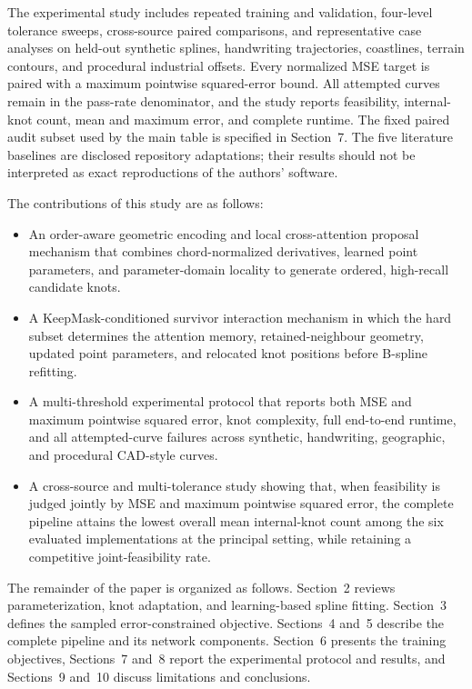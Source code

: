 \documentclass[preprint,12pt]{elsarticle}
\begin{document}
The experimental study includes repeated training and validation, four-level
tolerance sweeps, cross-source paired comparisons, and representative case
analyses on held-out synthetic splines, handwriting trajectories, coastlines,
terrain contours, and procedural industrial offsets. Every normalized MSE
target is paired with a maximum pointwise squared-error bound. All attempted
curves remain in the pass-rate denominator, and the study reports feasibility,
internal-knot count, mean and maximum error, and complete runtime. The fixed
paired audit subset used by the main table is specified in Section~7. The five
literature baselines are disclosed repository adaptations; their results should
not be interpreted as exact reproductions of the authors' software.

The contributions of this study are as follows:
\begin{itemize}
\item An order-aware geometric encoding and local cross-attention proposal
mechanism that combines chord-normalized derivatives, learned point
parameters, and parameter-domain locality to generate ordered, high-recall
candidate knots.
\item A KeepMask-conditioned survivor interaction mechanism in which the hard
subset determines the attention memory, retained-neighbour geometry, updated
point parameters, and relocated knot positions before B-spline refitting.
\item A multi-threshold experimental protocol that reports both MSE and
maximum pointwise squared error, knot complexity, full end-to-end runtime, and
all attempted-curve failures across synthetic, handwriting, geographic, and
procedural CAD-style curves.
\item A cross-source and multi-tolerance study showing that, when feasibility
is judged jointly by MSE and maximum pointwise squared error, the complete
pipeline attains the lowest overall mean internal-knot count among the six
evaluated implementations at the principal setting, while retaining a
competitive joint-feasibility rate.
\end{itemize}

The remainder of the paper is organized as follows. Section~2 reviews
parameterization, knot adaptation, and learning-based spline fitting.
Section~3 defines the sampled error-constrained objective. Sections~4 and~5
describe the complete pipeline and its network components. Section~6 presents
the training objectives, Sections~7 and~8 report the experimental protocol and
results, and Sections~9 and~10 discuss limitations and conclusions.
\end{document}
